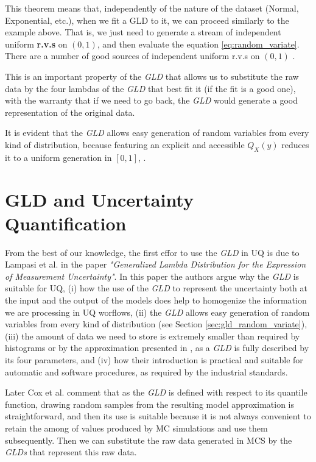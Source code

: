 This theorem means that, independently of the nature of the dataset (Normal, Exponential, etc.), when we fit a GLD to it, we can proceed similarly to the example above. That is, we just need to generate a stream of independent uniform \textbf{r.v.s} on $(0, 1)$, and then evaluate the equation \ref{eq:random_variate}. There are a number of good sources of independent uniform r.v.s on $(0, 1)$ \cite{Karian2011}. 

This is an important property of the \textit{GLD} that allows us to substitute the raw data by the four lambdas of the \textit{GLD} that best fit it (if the fit is a good one), with the warranty that if we need to go back, the \textit{GLD} would generate a good representation of the original data.

It is evident that the \textit{GLD} allows easy generation of random variables from every kind of distribution, because featuring an explicit and accessible $Q_{X}(y)$ reduces it to a uniform generation in $[0,1]$, \cite{Lampasi2006}.


\section{GLD and Uncertainty Quantification}\label{sec:gld_and_uq}
From the best of our knowledge, the first effor to use the \textit{GLD} in UQ is due to Lampasi et al. \cite{Lampasi2006} in the paper \textit{"Generalized Lambda Distribution for the Expression of Measurement Uncertainty"}. In this paper the authors argue why the \textit{GLD} is suitable for UQ, (i) how the use of the \textit{GLD} to represent the uncertainty both at the input and the output of the models does help to homogenize the information we are processing in UQ worflows, (ii) the \textit{GLD} allows easy generation of random variables from every kind of distribution (see Section \ref{sec:gld_random_variate}), (iii) the amount of data we need to store is extremely smaller than required by histograms or by the approximation presented in \cite{Jcgm2008}, as a \textit{GLD} is fully described by its four parameters, and (iv) how their introduction is practical and suitable for automatic and software procedures, as required by the industrial standards.

Later Cox et al. \cite{Cox2012} comment that as the \textit{GLD} is defined with respect to its quantile function, drawing random samples from the resulting model approximation is straightforward, and then its use is suitable because it is not always convenient to retain the among of values produced by MC simulations and use them subsequently. Then we can substitute the raw data generated in MCS by the \textit{GLDs} that represent this raw data.

